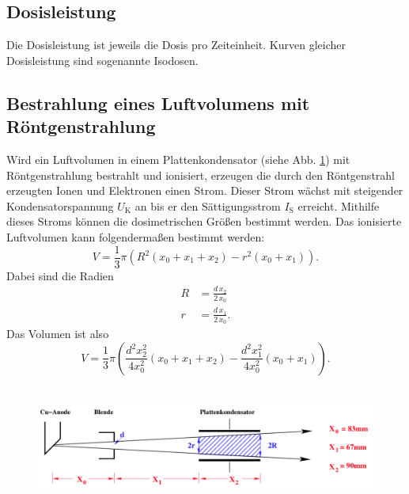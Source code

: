 \subsection{Dosisleistung}
Die Dosisleistung ist jeweils die Dosis pro Zeiteinheit.
Kurven gleicher Dosisleistung sind sogenannte Isodosen.

\subsection{Bestrahlung eines Luftvolumens mit Röntgenstrahlung}
Wird ein Luftvolumen in einem Plattenkondensator
(siehe Abb. \ref{fig:Strahlgeometrie}) mit
Röntgenstrahlung bestrahlt und ionisiert, erzeugen die durch
den Röntgenstrahl erzeugten Ionen und Elektronen einen Strom.
Dieser Strom wächst mit steigender Kondensatorspannung 
$U_\text{K}$ an bis er den Sättigungsstrom $I_\text{S}$
erreicht. Mithilfe dieses Stroms können die dosimetrischen
Größen bestimmt werden.
\newline
Das ionisierte Luftvolumen kann folgendermaßen bestimmt werden:
\begin{equation*}
    V = \frac{1}{3} \pi (R^2 (x_0 + x_1 + x_2) - r^2 (x_0 + x_1)). 
\end{equation*}
Dabei sind die Radien
\begin{align*}
    R &= \frac{d \, x_2}{2 \, x_0} \\
    r &= \frac{d \, x_1}{2 \, x_0}. 
\end{align*}
Das Volumen ist also 
\begin{equation}
    V = \frac{1}{3} \pi \left(\frac{d^2 x_2^2}{4 x_0^2}(x_0 + x_1 + x_2) - \frac{d^2 x_1^2}{4 x_0^2}(x_0 + x_1)\right).
    \label{eqn:V}
\end{equation}

\begin{figure}
    \centering
    \includegraphics[width=12cm, height=4cm]{build/strahl.png}
    \caption{\cite{V607}}
    \label{fig:Strahlgeometrie}
\end{figure}

 
